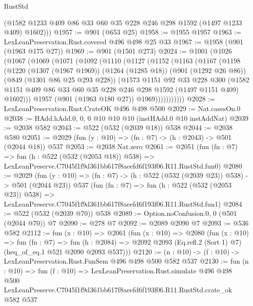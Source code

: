 \begin{lexlean}{RustStd}
\begin{coremodule}
        (@1582 @1233 @409 @86 @33 @60 @35 @228 @246 @298 @1592 (@1497 @1233 @409) @1602)))
@1957 := @901 (@653 @25)
@1958 := @1955 @1957
@1963 := LexLeanPreservation.Rust.covered @496 @498 @25 @33
@1967 := @1958 (@901 (@1963 @175 @27))
@1969 := @901 (@1501 @273)
@2024 := @1001
    (@1026
      (@1067
        (@1069
          (@1071
            (@1092
              (@1110
                (@1127
                  (@1152
                    (@1163
                      (@1167
                        (@1198
                          (@1220
                            (@1307 (@1967 @1969))
                            (@1264 (@1285 @18))
                            (@901 (@1292 @26 @86))
                            (@849 (@1301 @86 @25 @293 @228))
                            (@1573
                              @1151
                              @92
                              @33
                              @228
                              @300
                              (@1582
                                @1151
                                @409
                                @86
                                @33
                                @60
                                @35
                                @228
                                @246
                                @298
                                @1592
                                (@1497 @1151 @409)
                                @1602)))
                          @1957
                          (@901 (@1963 @180 @27))
                          @1969)))))))))))
@2028 := LexLeanPreservation.Rust.CrateOK @496 @498 @500
@2029 := Nat.casesOn.{0}
@2038 := HAdd.hAdd.{0, 0, 0} @10 @10 @10 (instHAdd.{0} @10 instAddNat)
@2039 := @2038 @582
@2043 := @522 (@532 (@2039 @18)) @538
@2044 := @2038 @580
@2051 := @2029 (fun (y : @10) => (fn : @7) -> (h : @2043) -> @501 (@2044 @18)) @537
@2053 := @2038 Nat.zero
@2061 := @2051
    (fun (fn : @7) =>
    fun (h : @522 (@532 (@2053 @18)) @538) =>
    LexLeanPreserve.C7045f1f9d361bb617f8aeefd6f193f06.R11.RustStd.fun0)
@2080 := @2029
    (fun (y : @10) => (fn : @7) -> (h : @522 (@532 (@2039 @23)) @538) -> @501 (@2044 @23))
    @537
    (fun (fn : @7) =>
    fun (h : @522 (@532 (@2053 @23)) @538) =>
    LexLeanPreserve.C7045f1f9d361bb617f8aeefd6f193f06.R11.RustStd.fun1)
@2084 := @522 (@532 (@2039 @70)) @538
@2089 := Option.noConfusion.{0, 0} (@501 (@2044 @70)) @7
@2090 := @278 @7
@2092 := @2089 @2090 @7
@2093 := @536 @582
@2112 := fun (x : @10) =>
  @2061
    (fun (x : @10) =>
    @2080
      (fun (x : @10) =>
      fun (fn : @7) =>
      fun (h : @2084) =>
      @2092 @2093 (Eq.refl.{2} (Sort 1) @7) (heq_of_eq.{1} @521 @2090 @2093 @537)))
@2120 := (n : @10) -> (f : @10) -> LexLeanPreservation.Rust.FunSem @496 @498 @500 @582 @537
@2130 := fun (n : @10) =>
  fun (f : @10) =>
  LexLeanPreservation.Rust.simulate
    @496
    @498
    @500
    LexLeanPreserve.C7045f1f9d361bb617f8aeefd6f193f06.R11.RustStd.crate_ok
    @582
    @537
\end{coremodule}
\end{lexlean}
